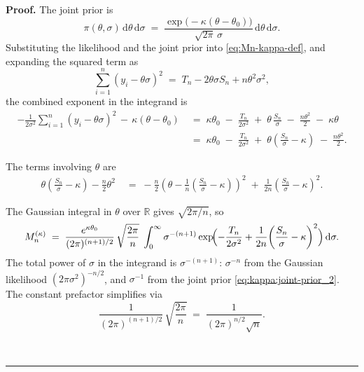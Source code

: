 \documentclass{article}%
\newenvironment{proof}[1][Proof]{\noindent\textbf{#1.} }{\ \rule{0.5em}{0.5em}}
\begin{document}
\begin{proof}
The joint prior is
\begin{equation}
  \pi(\theta, \sigma)\, \mathrm{d}\theta\, \mathrm{d}\sigma
  \;=\;
  \frac{\exp\!\bigl(-\kappa(\theta - \theta_0)\bigr)}{\sqrt{2\pi}\, \sigma}\,
  \mathrm{d}\theta\, \mathrm{d}\sigma.
  \label{eq:kappa:joint-prior_2}
\end{equation}
Substituting the likelihood and the
joint prior into
\eqref{eq:Mn-kappa-def}, and expanding the squared term as
\[
  \sum_{i=1}^n (y_i - \theta \sigma)^2
  \;=\; T_n - 2 \theta \sigma S_n + n \theta^2 \sigma^2,
\]
the combined exponent in the integrand is
    \begin{align*}
  -\frac{1}{2\sigma^2} \sum_{i=1}^n (y_i - \theta\sigma)^2
  \,-\, \kappa(\theta - \theta_0)
  &\;=\;
  \kappa \theta_0
  \;-\; \frac{T_n}{2\sigma^2}
  \;+\; \theta\, \frac{S_n}{\sigma}
  \;-\; \frac{n \theta^2}{2}
  \;-\; \kappa \theta \\
  &\;=\;
  \kappa \theta_0
  \;-\; \frac{T_n}{2\sigma^2}
  \;+\; \theta\!\left(\frac{S_n}{\sigma} - \kappa\right)
  \;-\; \frac{n \theta^2}{2}.
\end{align*}

The terms involving $\theta$ are
\begin{align*}
  \theta\!\left(\frac{S_n}{\sigma} - \kappa\right)
  - \frac{n}{2} \theta^2
  &\;=\;
  -\frac{n}{2}\!\left(\theta - \frac{1}{n}\!\left(\frac{S_n}{\sigma}
                                                 - \kappa\right)\!\right)^2
  \;+\; \frac{1}{2n}\!\left(\frac{S_n}{\sigma} - \kappa\right)^2.
\end{align*}

The Gaussian integral in $\theta$ over $\mathbb{R}$ gives
$\sqrt{2\pi/n}$, so
\begin{align}
  M_n^{(\kappa)}
  \;=\;
  \frac{e^{\kappa \theta_0}}{(2\pi)^{(n+1)/2}}\,
  \sqrt{\frac{2\pi}{n}}
  \;\int_0^\infty
  \sigma^{-(n+1)}
  \exp\!\Bigl(
    -\frac{T_n}{2\sigma^2}
    + \frac{1}{2n}\!\left(\frac{S_n}{\sigma} - \kappa\right)^2
  \Bigr)\, \mathrm{d}\sigma.
  \label{eq:kappa:after-theta_2}
\end{align}
The total power of $\sigma$ in the integrand is $\sigma^{-(n+1)}$:
$\sigma^{-n}$ from the Gaussian likelihood
$(2\pi\sigma^2)^{-n/2}$, and $\sigma^{-1}$ from the joint prior
\eqref{eq:kappa:joint-prior_2}.  The constant prefactor simplifies via
\[
  \frac{1}{(2\pi)^{(n+1)/2}}\, \sqrt{\frac{2\pi}{n}}
  \;=\;
  \frac{1}{(2\pi)^{n/2} \sqrt n}.
\]


\end{proof}
\end{document}

